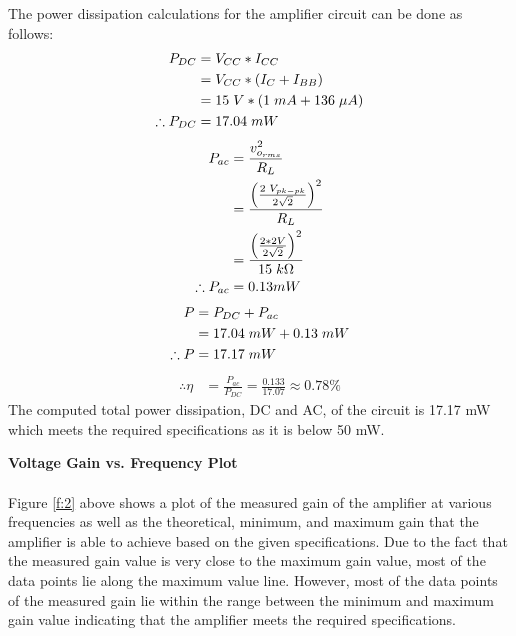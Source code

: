 \documentclass{article}
\begin{document}
	The power dissipation calculations for the amplifier circuit can be done as follows:
	\begin{align*}
		P_{DC} &= V_{CC} * I_{CC}\\
		&= V_{CC} * (I_{C} + I_{BB})\\
		&= 15 \hspace{1mm} V * (1 \hspace{1mm} mA + 136 \hspace{1mm}\mu A)\\
		\therefore P_{DC} &= 17.04 \hspace{1mm} mW
	\end{align*}
	\begin{align*}
		P_{ac} &= \frac{v_{o_{rms}}^{2}}{R_{L}}\\
		&= \frac{\left(\frac{2 \hspace{1mm} V_{pk-pk}}{2\sqrt{2}}\right)^{2}}{R_L}\\
		&= \frac{\left(\frac{2 * 2 V}{2\sqrt{2}}\right)^{2}}{15 \hspace{1mm} k\Omega}\\
		\therefore P_{ac} &= 0.13 mW
	\end{align*}
	\begin{align*}
		P &= P_{DC} + P_{ac}\\
		&= 17.04 \hspace{1mm} mW + 0.13 \hspace{1mm} mW\\
		\therefore P &= 17.17 \hspace{1mm} mW
	\end{align*}
	\begin{align*}
		\therefore\eta &= \frac{P_{ac}}{P_{DC}}
		= \frac{0.133}{17.07}
		\approx 0.78\% 
	\end{align*}
	The computed total power dissipation, DC and AC, of the circuit is 17.17 mW which meets the required specifications as it is below 50 mW.
	
	\pagebreak
	
	\noindent\textbf{Voltage Gain vs. Frequency Plot}\\\\
	\noindent Figure \ref{f:2} above shows a plot of the measured gain of the amplifier at various frequencies as well as the theoretical, minimum, and maximum gain that the amplifier is able to achieve based on the given specifications.
	Due to the fact that the measured gain value is very close to the maximum gain value, most of the data points lie along the maximum value line.
	However, most of the data points of the measured gain lie within the range between the minimum and maximum gain value indicating that the amplifier meets the required specifications.\\\\
	
\end{document}
